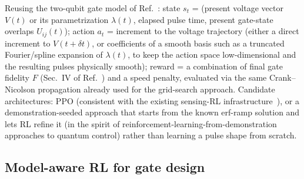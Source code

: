 \documentclass[aps,prapplied,reprint,superscriptaddress,longbibliography]{revtex4-2}
\begin{document}
Reusing the two-qubit gate model of Ref.~\cite{leinonen2025}: state $s_t$ = (present voltage vector
$V(t)$ or its parametrization $\lambda(t)$, elapsed pulse time, present gate-state overlaps
$U_{ij}(t)$); action $a_t$ = increment to the voltage trajectory (either a direct increment to
$V(t+\delta t)$, or coefficients of a smooth basis such as a truncated Fourier/spline expansion of
$\lambda(t)$, to keep the action space low-dimensional and the resulting pulses physically smooth);
reward = a combination of final gate fidelity $F$ (Sec.~IV of Ref.~\cite{leinonen2025}) and a speed
penalty, evaluated via the same Crank--Nicolson propagation already used for the grid-search
approach. Candidate architectures: PPO (consistent with the existing sensing-RL
infrastructure~\cite{schulman2017proximal}), or a demonstration-seeded approach that starts from the
known erf-ramp solution and lets RL refine it (in the spirit of reinforcement-learning-from-demonstration
approaches to quantum control) rather than learning a pulse shape from scratch.

\subsection{Model-aware RL for gate design}
\label{sec:model-aware-rl}
\end{document}
